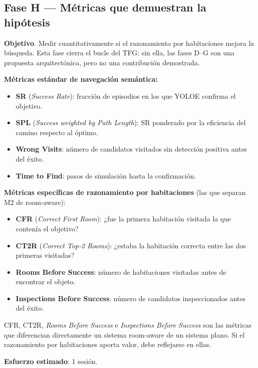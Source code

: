 \documentclass[11pt,a4paper]{article}
\begin{document}
\subsection{Fase H --- Métricas que demuestran la hipótesis}
\label{sec:fase-h}

\textbf{Objetivo}. Medir cuantitativamente si el razonamiento por
habitaciones mejora la búsqueda. Esta fase cierra el bucle del TFG: sin ella,
las fases D--G son una propuesta arquitectónica, pero no una contribución
demostrada.

\textbf{Métricas estándar de navegación semántica:}

\begin{itemize}
  \item \textbf{SR} (\textit{Success Rate}): fracción de episodios en los
        que YOLOE confirma el objetivo.
  \item \textbf{SPL} (\textit{Success weighted by Path Length}): SR
        ponderado por la eficiencia del camino respecto al óptimo.
  \item \textbf{Wrong Visits}: número de candidatos visitados sin detección
        positiva antes del éxito.
  \item \textbf{Time to Find}: pasos de simulación hasta la confirmación.
\end{itemize}

\textbf{Métricas específicas de razonamiento por habitaciones} (las que
separan M2 de room-aware):

\begin{itemize}
  \item \textbf{CFR} (\textit{Correct First Room}): ¿fue la primera
        habitación visitada la que contenía el objetivo?
  \item \textbf{CT2R} (\textit{Correct Top-2 Rooms}): ¿estaba la
        habitación correcta entre las dos primeras visitadas?
  \item \textbf{Rooms Before Success}: número de habitaciones visitadas
        antes de encontrar el objeto.
  \item \textbf{Inspections Before Success}: número de candidatos
        inspeccionados antes del éxito.
\end{itemize}

CFR, CT2R, \textit{Rooms Before Success} e \textit{Inspections Before
Success} son las métricas que diferencian directamente un sistema room-aware
de un sistema plano. Si el razonamiento por habitaciones aporta valor, debe
reflejarse en ellas.

\textbf{Esfuerzo estimado}: 1 sesión.
\end{document}
